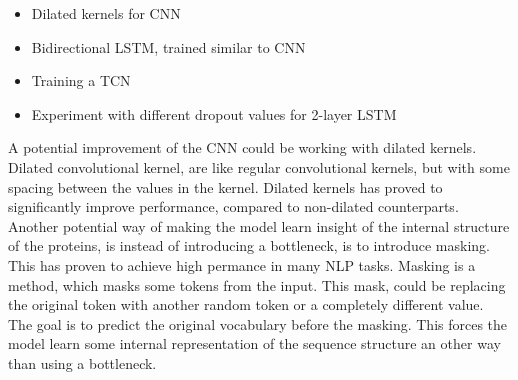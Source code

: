 \begin{itemize}
\item Dilated kernels for CNN
\item Bidirectional LSTM, trained similar to CNN
\item Training a TCN \cite{intro}
\item Experiment with different dropout values for 2-layer LSTM
\end{itemize}

\noindent
A potential improvement of the CNN could be working with dilated kernels. Dilated convolutional kernel, are like regular convolutional kernels, but with some spacing between the values in the kernel. Dilated kernels has proved to significantly improve performance, compared to non-dilated counterparts\cite{cp}. \\

\noindent
Another potential way of making the model learn insight of the internal structure of the proteins, is instead of introducing a bottleneck, is to introduce masking. This has proven to achieve high permance in many NLP tasks\cite{BERT}. Masking is a method, which masks some tokens from the input. This mask, could be replacing the original token with another random token or a completely different value. The goal is to predict the original vocabulary before the masking. This forces the model learn some internal representation of the sequence structure an other way than using a bottleneck.

